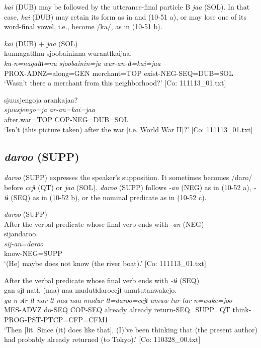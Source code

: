\begin{xlist}
\textit{kai} (DUB) may be followed by the utterance-final particle B \textit{jaa} (SOL). In that case, \textit{kai} (DUB) may retain its form as in  and (10-51 a), or may lose one of its word-final vowel, i.e., become /ka/, as in (10-51 b).

\ea\label{ex:10.51}   \textit{kai} (DUB) + \textit{jaa} (SOL)\\
  \ea  %
      \glll    kunnagatɨɨnu  {\textbar}sjoobainin{\textbar}na  wurantɨkaijaa.\\
      \textit{ku-n=nagatɨɨ=nu}  \textit{sjoobainin=ja}  \textit{wur-an-tɨ=kai=jaa}\\
      PROX-ADNZ=along=GEN  merchant=TOP  exist-NEG-SEQ=DUB=SOL\\
      \glt       ‘Wasn’t there a merchant from this neighborhood?’ [Co: 111113\_01.txt]

  \ex %
      \glll    {\textbar}sjuusjengo{\textbar}ja  arankajaa?\\
      \textit{sjuusjengo=ja}  \textit{ar-an=kai=jaa}\\
      after.war=TOP  COP-NEG=DUB=SOL\\
      \glt       ‘Isn’t (this picture taken) after the war [i.e. World War II]?’ [Co: 111113\_01.txt]
    \z
\z

\subsection{\textit{daroo} (SUPP)}\label{sec:10.3.7}

\textit{daroo} (SUPP) expresses the speaker’s supposition. It sometimes becomes /daro/ before \textit{ccjɨ} (QT) or \textit{jaa} (SOL). \textit{daroo} (SUPP) follows \textit{{}-an} (NEG) as in (10-52 a), \textit{{}-tɨ} (SEQ) as in (10-52 b), or the nominal predicate as in (10-52 c).

\ea\label{ex:10.52}   \textit{daroo} (SUPP)\\
  \ea After the verbal predicate whose final verb ends with \textit{{}-an} (NEG)\\
      \glll    sijandaroo.\\
    \textit{sij-an=daroo}\\
    know-NEG=SUPP\\
\glt     ‘(He) maybe does not know (the river boat).’  [Co: 111113\_01.txt]

  \ex After the verbal predicate whose final verb ends with \textit{{}-tɨ} (SEQ)\\
      \glll    gan  sjɨ  natɨ,  (naa)  naa  mudutɨdaroccjɨ   umututanwakejo.\\
    \textit{ga-n}  \textit{sɨr-tɨ}  \textit{nar-tɨ}  \textit{naa}  \textit{naa}  \textit{mudur-tɨ=daroo=ccjɨ}   \textit{umuw-tur-tar-n=wake=joo}\\
    MES-ADVZ  do-SEQ  COP-SEQ  already  already  return-SEQ=SUPP=QT  think-PROG-PST-PTCP=CFP=CFM1\\
\glt     ‘Then [lit. Since (it) does like that], (I)’ve been thinking that (the present author) had probably already returned (to Tokyo).’  [Co: 110328\_00.txt]


\end{xlist}
